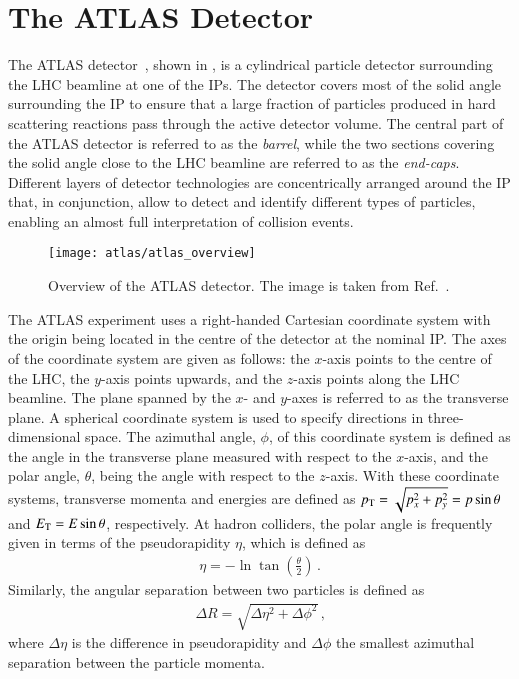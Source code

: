 \section{The ATLAS Detector}%
\label{sec:atlas}

The ATLAS detector~\cite{PERF-2007-01}, shown in
, is a cylindrical particle detector
surrounding the LHC beamline at one of the IPs. The detector covers most of the
solid angle surrounding the IP to ensure that a large fraction of particles
produced in hard scattering reactions pass through the active detector volume.
The central part of the ATLAS detector is referred to as the \emph{barrel},
while the two sections covering the solid angle close to the LHC beamline are
referred to as the \emph{end-caps}. Different layers of detector technologies
are concentrically arranged around the IP that, in conjunction, allow to detect
and identify different types of particles, enabling an almost full
interpretation of collision events.

\begin{figure}[htbp]
  \centering

  \texttt{[image: atlas/atlas\_overview]}

  \caption[Overview of the ATLAS detector.]{Overview of the ATLAS detector. The
    image is taken from Ref.~\cite{PERF-2007-01}.}%
  \label{fig:atlas_detector_overview}
\end{figure}

The ATLAS experiment uses a right-handed Cartesian coordinate system with the
origin being located in the centre of the detector at the nominal IP. The axes
of the coordinate system are given as follows: the $x$-axis points to the centre
of the LHC, the $y$-axis points upwards, and the $z$-axis points along the LHC
beamline. The plane spanned by the $x$- and $y$-axes is referred to as the
transverse plane. A spherical coordinate system is used to specify directions in
three-dimensional space. The azimuthal angle, $\phi$, of this coordinate system
is defined as the angle in the transverse plane measured with respect to the
$x$-axis, and the polar angle, $\theta$, being the angle with respect to the
$z$-axis. With these coordinate systems, transverse momenta and energies are
defined as $p_{\text{T}} = \sqrt{p_x^2 + p_y^2} = p \sin\theta$ and $E_{\text{T}} = E \sin\theta$,
respectively. At hadron colliders, the polar angle is frequently given in terms
of the pseudorapidity $\eta$, which is defined as
\begin{align*}
  \eta = - \ln\tan\left( \frac{\theta}{2} \right) \,\text{.}
\end{align*}
Similarly, the angular separation between two particles is defined as
\begin{align*}
  \Delta R = \sqrt{\Delta \eta^2 + \Delta \phi^2} \,\text{,}
\end{align*}
where $\Delta \eta$ is the difference in pseudorapidity and $\Delta \phi$ the
smallest azimuthal separation between the particle momenta.

